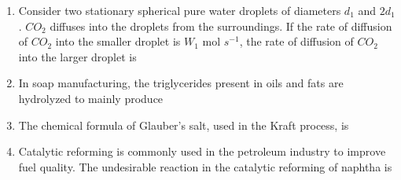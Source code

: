 \documentclass[journal]{IEEEtran}
\numberwithin{equation}{enumi}
\numberwithin{figure}{enumi}
\begin{document}
\begin{enumerate}[start=1, label={Q\arabic*.}]
\begin{enumerate}
  \end{enumerate}
  \item Consider two stationary spherical pure water droplets of diameters $d_1$ and $2d_1$. $CO_2$ diffuses into the droplets from the surroundings. If the rate of diffusion of $CO_2$ into the smaller droplet is $W_1$ mol $s^{-1}$, the rate of diffusion of $CO_2$ into the larger droplet is
\begin{enumerate} 
  \end{enumerate}
  \newpage
  \item In soap manufacturing, the triglycerides present in oils and fats are hydrolyzed to mainly produce
  \begin{enumerate} 
  \end{enumerate}
\item The chemical formula of Glauber's salt, used in the Kraft process, is
  \begin{enumerate} 
  \end{enumerate}
  \item Catalytic reforming is commonly used in the petroleum industry to improve fuel quality. The undesirable reaction in the catalytic reforming of naphtha is
  \begin{enumerate} 
\begin{multicols}{2}

\end{multicols}
\end{enumerate}
\end{enumerate}
\end{document}
